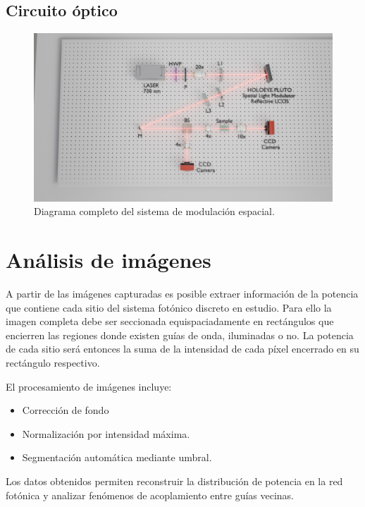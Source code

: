 \subsection{Circuito óptico}
\begin{figure}[H]
    \centering
    \includegraphics[width=\linewidth, trim={21cm 5cm 7cm 5cm},clip]{media/SLM_setupv1}
    \caption{Diagrama completo del sistema de modulación espacial.}
\end{figure}

\section{Análisis de imágenes \label{sec:analimag}}
A partir de las imágenes capturadas es posible extraer información de la potencia que contiene cada sitio del sistema fotónico discreto en estudio. Para ello la imagen completa debe ser seccionada equispaciadamente en rectángulos que encierren las regiones donde existen guías de onda, iluminadas o no. La potencia de cada sitio será entonces la suma de la intensidad de cada píxel encerrado en su rectángulo respectivo.

El procesamiento de imágenes incluye:
\begin{itemize}
    \item Corrección de fondo
    \item Normalización por intensidad máxima.
    \item Segmentación automática mediante umbral.
\end{itemize}

Los datos obtenidos permiten reconstruir la distribución de potencia en la red fotónica y analizar fenómenos de acoplamiento entre guías vecinas.